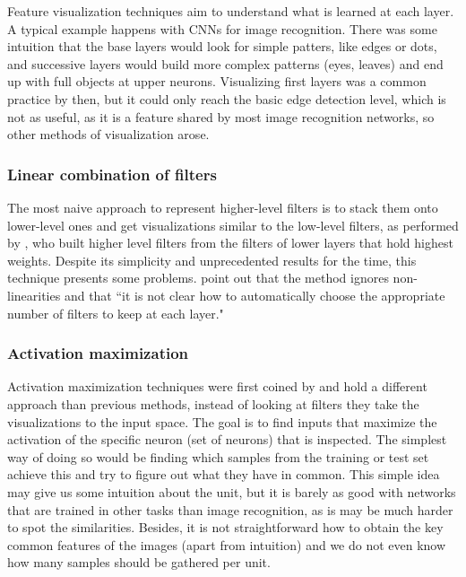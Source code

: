 	Feature visualization techniques aim to understand what is learned at each layer. A typical example happens with CNNs for image recognition. There was some intuition that the base layers would look for simple patters, like edges or dots, and successive layers would build more complex patterns (eyes, leaves) and end up with full objects at upper neurons. Visualizing first layers was a common practice by then, but it could only reach the basic edge detection level, which is not as useful, as it is a feature shared by most image recognition networks, so other methods of visualization arose.
	
		\subsubsection*{Linear combination of filters}
		The most naive approach to represent higher-level filters is to stack them onto lower-level ones and get visualizations similar to the low-level filters, as performed by \cite{Lee2009}, who built higher level filters from the filters of lower layers that hold highest weights. Despite its simplicity and unprecedented results for the time, this technique presents some problems. \cite{Erhan2009} point out that the method ignores non-linearities and that ``it is not clear how to automatically choose the appropriate number of filters to keep at each layer."
			
		\subsubsection*{Activation maximization}
		Activation maximization techniques were first coined by \cite{Erhan2009} and hold a different approach than previous methods, instead of looking at filters they take the visualizations to the input space. The goal is to find inputs that maximize the activation of the specific neuron (set of neurons) that is inspected. The simplest way of doing so would be finding which samples from the training or test set achieve this and try to figure out what they have in common. This simple idea may give us some intuition about the unit, but it is barely as good with networks that are trained in other tasks than image recognition, as is may be much harder to spot the similarities. Besides, it is not straightforward how to obtain the key common features of the images (apart from intuition) and we do not even know how many samples should be gathered per unit.
		
